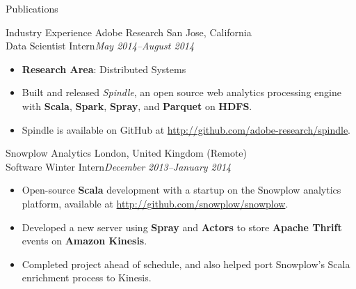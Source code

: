 \documentclass[letter]{article}
\begin{document}
\begin{minipage}{\textwidth}
{\huge Publications }
  \nocite{*}
  \printbibliography[heading=none,type=inproceedings,prefixnumbers=C]
  \end{minipage}
  \begin{minipage}{\textwidth}
  \printbibliography[
    heading=none,type=article,keyword=journal,
    resetnumbers=true,prefixnumbers=J
  ]
  \printbibliography[
    heading=none,type=article,keyword=magazine,
    resetnumbers=true,prefixnumbers=M
  ]
  \bigskip
\end{minipage}\medskip

\begin{minipage}{\textwidth}
{\huge Industry Experience }
{\large Adobe Research } \hfill San Jose, California \\
Data Scientist Intern\hfill {\it May 2014--August 2014}
\begin{itemize}
  \item {\bf Research Area}: Distributed Systems
  \item Built and released {\it Spindle}, an open source web analytics processing engine with {\bf Scala}, {\bf Spark}, {\bf Spray}, and {\bf Parquet} on {\bf HDFS}.
  \item Spindle is available on GitHub at \url{http://github.com/adobe-research/spindle}.
\end{itemize}
\end{minipage}

\begin{minipage}{\textwidth}
\bigskip
{\large Snowplow Analytics } \hfill London, United Kingdom (Remote) \\
Software Winter Intern\hfill {\it December 2013--January 2014}
\begin{itemize}
  \item Open-source {\bf Scala} development with a startup on the Snowplow analytics platform, available at \url{http://github.com/snowplow/snowplow}.
  \item Developed a new server using {\bf Spray} and {\bf Actors} to store {\bf Apache Thrift} events on {\bf Amazon Kinesis}.
  \item Completed project ahead of schedule, and also helped port Snowplow's Scala enrichment process to Kinesis.
\end{itemize}
\end{minipage}
\end{document}
